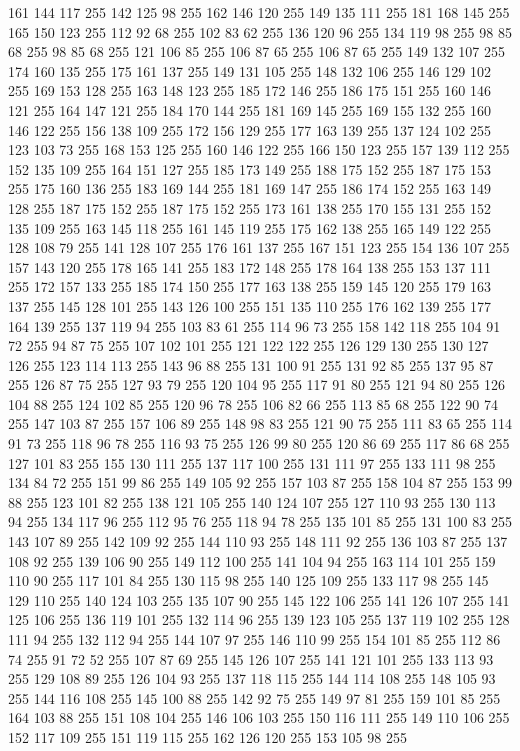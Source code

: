 161 144 117 255 142 125 98 255 162 146 120 255 149 135 111 255 181 168 145 255 165 150 123 255 112 92 68 255 102 83 62 255 136 120 96 255 134 119 98 255 98 85 68 255 98 85 68 255 121 106 85 255 106 87 65 255 106 87 65 255 149 132 107 255 174 160 135 255 175 161 137 255 149 131 105 255 148 132 106 255 146 129 102 255 169 153 128 255 163 148 123 255 185 172 146 255 186 175 151 255 160 146 121 255 164 147 121 255 184 170 144 255 181 169 145 255 169 155 132 255 160 146 122 255 156 138 109 255 172 156 129 255 177 163 139 255 137 124 102 255 123 103 73 255 168 153 125 255 160 146 122 255 166 150 123 255 157 139 112 255 152 135 109 255 164 151 127 255 185 173 149 255 188 175 152 255 187 175 153 255 175 160 136 255 183 169 144 255 181 169 147 255 186 174 152 255 163 149 128 255 187 175 152 255 187 175 152 255 173 161 138 255 170 155 131 255 152 135 109 255 163 145 118 255 161 145 119 255 175 162 138 255 165 149 122 255 128 108 79 255 141 128 107 255 176 161 137 255 167 151 123 255 154 136 107 255
157 143 120 255 178 165 141 255 183 172 148 255 178 164 138 255 153 137 111 255 172 157 133 255 185 174 150 255 177 163 138 255 159 145 120 255 179 163 137 255 145 128 101 255 143 126 100 255 151 135 110 255 176 162 139 255 177 164 139 255 137 119 94 255 103 83 61 255 114 96 73 255 158 142 118 255 104 91 72 255 94 87 75 255 107 102 101 255 121 122 122 255 126 129 130 255 130 127 126 255 123 114 113 255 143 96 88 255 131 100 91 255 131 92 85 255 137 95 87 255 126 87 75 255 127 93 79 255 120 104 95 255 117 91 80 255 121 94 80 255 126 104 88 255 124 102 85 255 120 96 78 255 106 82 66 255 113 85 68 255 122 90 74 255 147 103 87 255 157 106 89 255 148 98 83 255 121 90 75 255 111 83 65 255 114 91 73 255 118 96 78 255 116 93 75 255 126 99 80 255 120 86 69 255 117 86 68 255 127 101 83 255 155 130 111 255 137 117 100 255 131 111 97 255 133 111 98 255 134 84 72 255 151 99 86 255 149 105 92 255 157 103 87 255 158 104 87 255 153 99 88 255 123 101 82 255
138 121 105 255 140 124 107 255 127 110 93 255 130 113 94 255 134 117 96 255 112 95 76 255 118 94 78 255 135 101 85 255 131 100 83 255 143 107 89 255 142 109 92 255 144 110 93 255 148 111 92 255 136 103 87 255 137 108 92 255 139 106 90 255 149 112 100 255 141 104 94 255 163 114 101 255 159 110 90 255 117 101 84 255 130 115 98 255 140 125 109 255 133 117 98 255 145 129 110 255 140 124 103 255 135 107 90 255 145 122 106 255 141 126 107 255 141 125 106 255 136 119 101 255 132 114 96 255 139 123 105 255 137 119 102 255 128 111 94 255 132 112 94 255 144 107 97 255 146 110 99 255 154 101 85 255 112 86 74 255 91 72 52 255 107 87 69 255 145 126 107 255 141 121 101 255 133 113 93 255 129 108 89 255 126 104 93 255 137 118 115 255 144 114 108 255 148 105 93 255 144 116 108 255 145 100 88 255 142 92 75 255 149 97 81 255 159 101 85 255 164 103 88 255 151 108 104 255 146 106 103 255 150 116 111 255 149 110 106 255 152 117 109 255 151 119 115 255 162 126 120 255 153 105 98 255
